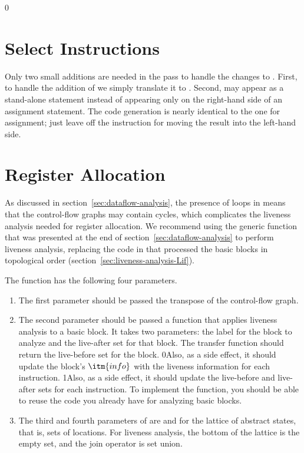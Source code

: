 \documentclass[7x10]{TimesAPriori_MIT}%
\def\racketEd{0}
\def\pythonEd{1}
\providecommand{\BookEdition}{1}
\let\edition\BookEdition
\newcommand{\racket}[1]{{\if\edition\racketEd{#1}\fi}}
\newcommand{\pythonColor}[0]{}
\newcommand{\python}[1]{{\if\edition\pythonEd\pythonColor #1\fi}}
\numberwithin{theorem}{chapter}
\numberwithin{definition}{chapter}
\numberwithin{equation}{chapter}
\begin{document}
{\if\edition\racketEd
  
\section{Select Instructions}
\label{sec:select-instructions-loop}

Only two small additions are needed in the 
pass to handle the changes to \LangCLoop{}. First, to handle the
addition of \VOID{} we simply translate it to .  Second,
 may appear as a stand-alone statement instead of 
appearing only on the right-hand side of an assignment statement. The code
generation is nearly identical to the one for assignment; just leave
off the instruction for moving the result into the left-hand side.

\fi}

\section{Register Allocation}
\label{sec:register-allocation-loop}

As discussed in section~\ref{sec:dataflow-analysis}, the presence of
loops in \LangLoop{} means that the control-flow graphs may contain cycles,
which complicates the liveness analysis needed for register
allocation.
%
We recommend using the generic  function that
was presented at the end of section~\ref{sec:dataflow-analysis} to
perform liveness analysis, replacing the code in
 that processed the basic blocks in topological
order (section~\ref{sec:liveness-analysis-Lif}).

The  function has the following four parameters.
\begin{enumerate}
\item The first parameter  should be passed the transpose
  of the control-flow graph.
\item The second parameter  should be passed a function
  that applies liveness analysis to a basic block. It takes two
  parameters: the label for the block to analyze and the live-after
  set for that block.  The transfer function should return the
  live-before set for the block.
  \racket{Also, as a side effect, it should update the block's
    $\itm{info}$ with the liveness information for each instruction.}
  \python{Also, as a side effect, it should update the live-before and
    live-after sets for each instruction.}
  To implement the  function, you should be able to
  reuse the code you already have for analyzing basic blocks.
\item The third and fourth parameters of  are
   and  for the lattice of abstract states,
  that is, sets of locations. For liveness analysis, the bottom of the
  lattice is the empty set, and the join operator is set union.
\end{enumerate}
\end{document}

